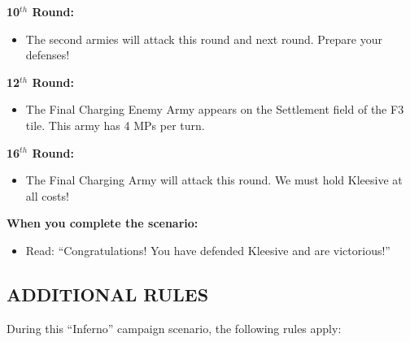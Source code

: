 \begin{multicols*}{2}
\columnbreak

\textbf{10$^{th}$ Round:}
\begin{itemize}
  \item The second armies will attack this round and next round. Prepare your defenses!
\end{itemize}


\textbf{12$^{th}$ Round:}
\begin{itemize}
  \item The Final Charging Enemy Army appears on the Settlement field of the F3 tile. This army has 4 MPs per turn.
\end{itemize}

\textbf{16$^{th}$ Round:}
\begin{itemize}
  \item The Final Charging Army will attack this round. We must hold Kleesive at all costs!
\end{itemize}

\textbf{When you complete the scenario:}
\begin{itemize}
  \item Read: ``Congratulations! You have defended Kleesive and are victorious!''
\end{itemize}

\subsection*{\MakeUppercase{Additional rules}}

During this ``Inferno'' campaign scenario, the following rules apply:


\end{multicols*}
